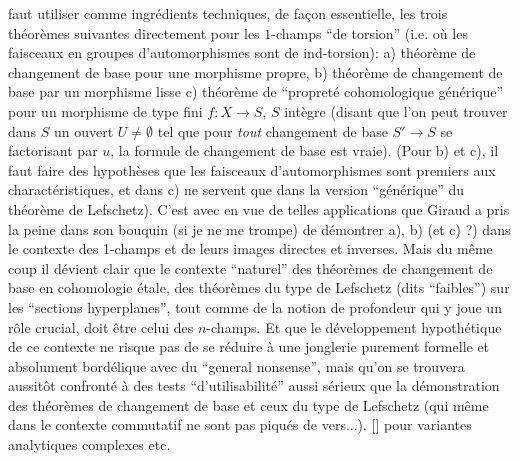 faut utiliser comme ingrédients techniques, de fa\c{c}on essentielle, les trois théorèmes suivantes directement pour les $1$-champs ``de torsion'' (i.e. où les faisceaux en groupes d'automorphismes sont de ind-torsion): a) théorème de changement de base pour une morphisme propre, b) théorème de changement de base par un morphisme lisse c) théorème de ``propreté cohomologique générique'' pour un morphisme de type fini $f: X \to S$, $S$ intègre (disant que l'on peut trouver dans $S$ un ouvert $U \neq \emptyset$ tel que pour \emph{tout} changement de base $S' \to S$ se factorisant par $u$, la formule de changement de base est vraie). (Pour b) et c), il faut faire des hypothèses que les faisceaux d'automorphismes sont premiers aux charactéristiques, et dans c) ne servent que dans la version ``générique'' du théorème de Lefschetz). C'est avec en vue de telles applications que Giraud a pris la peine dans son bouquin (si je ne me trompe) de démontrer a), b) (et c) ?) dans le contexte des 1-champs et de leurs images directes et inverses. Mais du même coup il dévient clair que le contexte ``naturel'' des théorèmes de changement de base en cohomologie étale, des théorèmes du type de Lefschetz (dits ``faibles'') sur les ``sections hyperplanes'', tout comme de la notion de profondeur qui y joue un rôle crucial, doit être celui des $n$-champs. Et que le développement hypothétique de ce contexte ne risque pas de se réduire à une jonglerie purement formelle et absolument bordélique avec du ``general nonsense'', mais qu'on se trouvera aussitôt confronté à des tests ``d'utilisabilité'' aussi sérieux que la démonstration des théorèmes de changement de base et ceux du type de Lefschetz (qui même dans le contexte commutatif ne sont pas piqués de vers...). [] pour variantes analytiques complexes etc.

